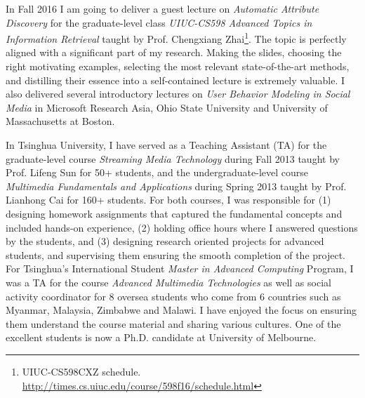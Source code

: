 \documentclass[10.5pt]{article}
\begin{document}
In Fall 2016 I am going to deliver a guest lecture on \textit{Automatic Attribute Discovery} for the graduate-level class \textit{UIUC-CS598 Advanced Topics in Information Retrieval} taught by Prof. Chengxiang Zhai\footnote{UIUC-CS598CXZ schedule. \url{http://times.cs.uiuc.edu/course/598f16/schedule.html}}. The topic is perfectly aligned with a significant part of my research. Making the slides, choosing the right motivating examples, selecting the most relevant state-of-the-art methods, and distilling their essence into a self-contained lecture is extremely valuable. I also delivered several introductory lectures on \textit{User Behavior Modeling in Social Media} in Microsoft Research Asia, Ohio State University and University of Massachusetts at Boston.

\vskip 0.06in
\vskip 0.02in

In Tsinghua University, I have served as a Teaching Assistant (TA) for the graduate-level course \textit{Streaming Media Technology} during Fall 2013 taught by Prof. Lifeng Sun for 50+ students, and the undergraduate-level course \textit{Multimedia Fundamentals and Applications} during Spring 2013 taught by Prof. Lianhong Cai for 160+ students. For both courses, I was responsible for (1) designing homework assignments that captured the fundamental concepts and included hands-on experience, (2) holding office hours where I answered questions by the students, and (3) designing research oriented projects for advanced students, and supervising them ensuring the smooth completion of the project. For Tsinghua's International Student \textit{Master in Advanced Computing} Program, I was a TA for the course \textit{Advanced Multimedia Technologies} as well as social activity coordinator for 8 oversea students who come from 6 countries such as Myanmar, Malaysia, Zimbabwe and Malawi. I have enjoyed the focus on ensuring them understand the course material and sharing various cultures. One of the excellent students is now a Ph.D. candidate at University of Melbourne.

\vskip 0.06in
\vskip 0.02in
\end{document}
